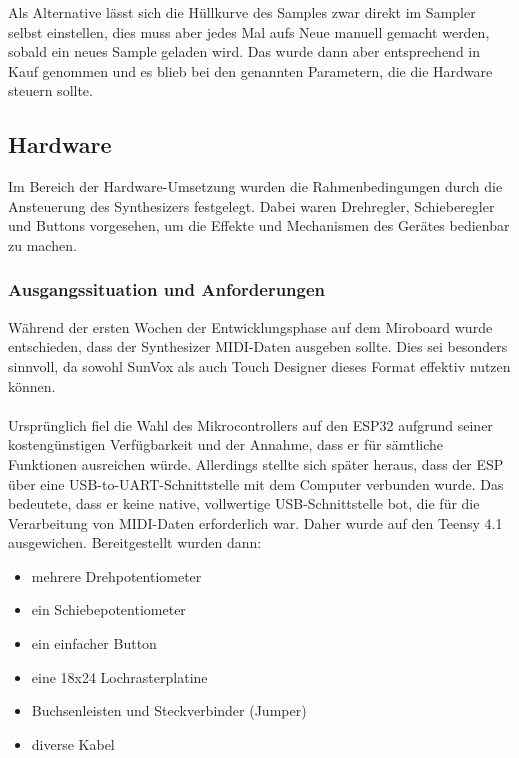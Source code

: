 \documentclass[12pt]{scrartcl}%
\theoremstyle{nonumberplain}
\begin{document}
\noindent Als Alternative lässt sich die Hüllkurve des Samples zwar direkt im Sampler selbst einstellen, dies muss aber jedes Mal aufs Neue manuell gemacht werden, sobald ein neues Sample geladen wird. Das wurde dann aber entsprechend in Kauf genommen und es blieb bei den genannten Parametern, die die Hardware steuern sollte.\\

\subsection{Hardware}

Im Bereich der Hardware-Umsetzung wurden die Rahmenbedingungen durch die Ansteuerung des Synthesizers festgelegt. Dabei waren Drehregler, Schieberegler und Buttons vorgesehen, um die Effekte und Mechanismen des Gerätes bedienbar zu machen.

\subsubsection{Ausgangssituation und Anforderungen}

Während der ersten Wochen der Entwicklungsphase auf dem Miroboard wurde entschieden, dass der Synthesizer MIDI-Daten ausgeben sollte. Dies sei besonders sinnvoll, da sowohl SunVox als auch Touch Designer dieses Format effektiv nutzen können.
\\\\
Ursprünglich fiel die Wahl des Mikrocontrollers auf den ESP32 aufgrund seiner kostengünstigen Verfügbarkeit und der Annahme, dass er für sämtliche Funktionen ausreichen würde. Allerdings stellte sich später heraus, dass der ESP über eine USB-to-UART-Schnittstelle mit dem Computer verbunden wurde. Das bedeutete, dass er keine native, vollwertige USB-Schnittstelle bot, die für die Verarbeitung von MIDI-Daten erforderlich war. Daher wurde auf den Teensy 4.1 ausgewichen.
\newpage
Bereitgestellt wurden dann:
\begin{itemize}
  \item mehrere Drehpotentiometer
  \item ein Schiebepotentiometer
  \item ein einfacher Button
  \item eine 18x24 Lochrasterplatine
  \item Buchsenleisten und Steckverbinder (Jumper)
  \item diverse Kabel
\end{itemize}
\end{document}
